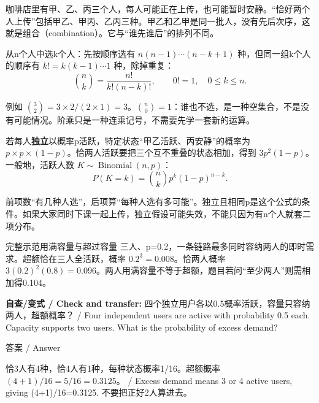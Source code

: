 

咖啡店里有甲、乙、丙三个人，每人可能正在上传，也可能暂时安静。“恰好两个人上传”包括甲乙、甲丙、乙丙三种。甲乙和乙甲是同一批人，没有先后次序，这就是组合（combination）。它与“谁先谁后”的排列不同。


从n个人中选k个人：先按顺序选有 \(n(n-1)\cdots(n-k+1)\) 种，但同一组k个人的顺序有 \(k!=k(k-1)\cdots1\) 种，除掉重复：
\[
\binom nk=\frac{n!}{k!(n-k)!},\qquad 0!=1,\quad0\le k\le n.\tag{M.33}
\]


例如 \(\binom32=3\times2/(2\times1)=3\)。\(\binom n0=1\)：谁也不选，是一种空集合，不是没有可能情况。阶乘只是一种连乘记号，不需要先学一套新的运算。


若每人\textbf{独立}以概率p活跃，特定状态“甲乙活跃、丙安静”的概率为 \(p\times p\times(1-p)\)。恰两人活跃要把三个互不重叠的状态相加，得到 \(3p^2(1-p)\)。一般地，活跃人数 \(K\sim\operatorname{Binomial}(n,p)\)：
\[
P(K=k)=\binom nk p^k(1-p)^{n-k}.\tag{M.34}
\]


前项数“有几种人选”，后项算“每种人选有多可能”。独立且相同p是这个公式的条件。如果大家同时下课一起上传，独立假设可能失效，不能只因为有n个人就套二项分布。






\begin{StudyBlock}{完整示范}{用满容量与超过容量}
三人、p=0.2，一条链路最多同时容纳两人的即时需求。超额恰在三人全活跃，概率 \(0.2^3=0.008\)。恰两人概率 \(3(0.2)^2(0.8)=0.096\)。两人用满容量不等于超额，题目若问“至少两人”则需相加得0.104。
\end{StudyBlock}


\textbf{自查/变式 / Check and transfer:} 四个独立用户各以0.5概率活跃，容量只容纳两人，超额概率？ / Four independent users are active with probability 0.5 each. Capacity supports two users. What is the probability of excess demand?



\begin{StudySolution}{答案 / Answer}


恰3人有4种，恰4人有1种，每种状态概率1/16。超额概率 \((4+1)/16=5/16=0.3125\)。 / Excess demand means 3 or 4 active users, giving (4+1)/16=0.3125. 不要把正好2人算进去。


\end{StudySolution}


